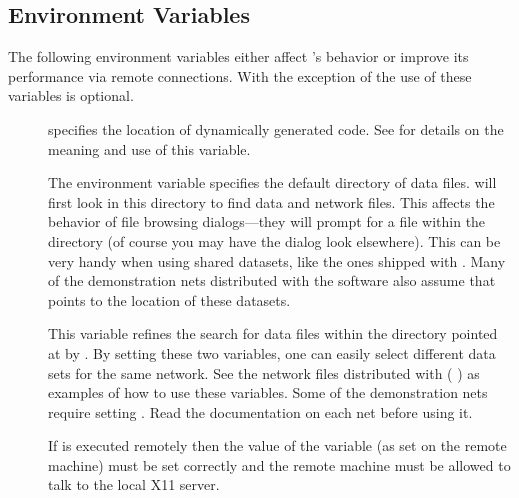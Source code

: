 \subsection{Environment Variables}
\label{sec:environ} 

\newcommand{\envitem}[1]{\item[\envvar{#1}]\mbox{}}

The following environment variables either affect \sr{}'s behavior or
improve its performance via remote connections.  With the exception of
 the use of these variables is
optional.

\begin{description}
\envitem{SCIRUN\_ON\_THE\_FLY\_LIBS\_DIR}
  
   specifies the location of
  dynamically generated code.  See  for details on the meaning and use of
  this variable.

\envitem{SCIRUN\_DATA}

  The environment variable  specifies the
  default directory of \sr{} data files.  \sr{} will first look
  in this directory to find data and network files.  This affects
  the behavior of file browsing dialogs---they will prompt for
  a file within the  directory (of course
  you may have the dialog look elsewhere).  This can be very
  handy when using shared datasets, like the ones shipped with
  \sr{}.  Many of the demonstration nets distributed with the
  software also assume that  points to the
  location of these datasets.

\envitem{SCIRUN\_DATASET}

  This variable refines the search for data files within the
  directory pointed at by .  By setting
  these two variables, one can easily select different data sets
  for the same network.  See the network files distributed with
  \sr{} (\eg{} ) as
  examples of how to use these variables.  Some of the
  demonstration nets require setting .  Read
  the documentation on each net before using it.
  

\envitem{DISPLAY}
  
  If \sr{} is executed remotely then the value of the
   variable (as set on the remote machine) must
  be set correctly and the remote machine must be allowed to
  talk to the local X11 server.
  

\end{description}

